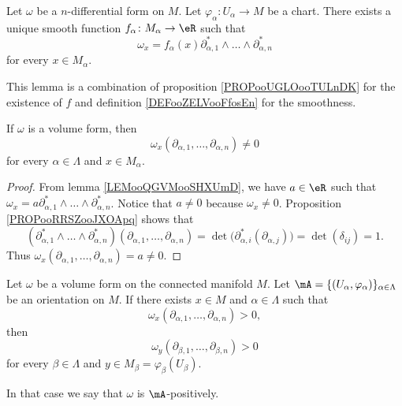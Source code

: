 \begin{lemma}		\label{LEMooQGVMooSHXUmD}
	Let \( \omega\) be a \( n\)-differential form on \( M\). Let \(\varphi_{\alpha} \colon U_{\alpha} \to M  \) be a chart. There exists a unique smooth function \(f_{\alpha} \colon M_{\alpha}\to \eR   \) such that
	\begin{equation}
		\omega_x=f_{\alpha}(x)\partial^*_{\alpha, 1}\wedge\ldots\wedge\partial^*_{\alpha, n}
	\end{equation}
	for every \( x\in M_{\alpha}\).
\end{lemma}

This lemma is a combination of proposition \ref{PROPooUGLOooTULnDK} for the existence of \( f\) and definition \ref{DEFooZELVooFfosEn} for the smoothness.


\begin{lemma}	\label{LEMooKJRCooCklXie}
	If \( \omega\) is a volume form, then
	\begin{equation}
		\omega_x(\partial_{\alpha, 1},\ldots,\partial_{\alpha,n})\neq 0
	\end{equation}
	for every \( \alpha\in \Lambda\) and \( x\in M_{\alpha}\).
\end{lemma}

\begin{proof}
	From lemma \ref{LEMooQGVMooSHXUmD}, we have \( a\in \eR\) such that \( \omega_x=a\partial^*_{\alpha,1}\wedge\ldots\wedge\partial^*_{\alpha,n}\). Notice that \( a\neq 0\) because \( \omega_x\neq 0\). Proposition \ref{PROPooRRSZooJXOApq} shows that
	\begin{equation}		\label{EQooRRHNooBVgAnF}
		(\partial^*_{\alpha,1}\wedge\ldots\wedge\partial^*_{\alpha,n})(\partial_{\alpha,1},\ldots,\partial_{\alpha,n})=\det\big( \partial_{\alpha,i}^*(\partial_{\alpha,j}) \big)=\det(\delta_{ij})=1.
	\end{equation}
	Thus \( \omega_x(\partial_{\alpha,1},\ldots,\partial_{\alpha,n})=a\neq 0\).
\end{proof}

\begin{lemmaDef}		\label{LEMooELOHooYtXSEH}
	Let \( \omega\) be a volume form on the connected manifold \( M\). Let \( \mA=\{ (U_{\alpha},\varphi_{\alpha})\}_{\alpha\in\Lambda}\) be an orientation on \( M\). If there exists \( x\in M\) and \( \alpha\in \Lambda\) such that
	\begin{equation}
		\omega_x(\partial_{\alpha,1},\ldots,\partial_{\alpha,n})>0,
	\end{equation}
	then
	\begin{equation}
		\omega_y(\partial_{\beta,1},\ldots,\partial_{\beta,n})>0
	\end{equation}
	for every \( \beta\in\Lambda \) and \( y\in M_{\beta}=\varphi_{\beta}(U_{\beta})\).

	In that case we say that \( \omega\) is  \( \mA\)-positively.
\end{lemmaDef}

